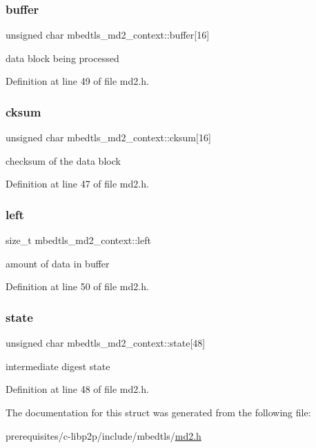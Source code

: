 \subsubsection{\texorpdfstring{buffer}{buffer}}
{\footnotesize\ttfamily unsigned char mbedtls\+\_\+md2\+\_\+context\+::buffer\mbox{[}16\mbox{]}}

data block being processed 

Definition at line 49 of file md2.\+h.

\mbox{\label{structmbedtls__md2__context_a12653607373c617159907a4b5d533c94}} 
\subsubsection{\texorpdfstring{cksum}{cksum}}
{\footnotesize\ttfamily unsigned char mbedtls\+\_\+md2\+\_\+context\+::cksum\mbox{[}16\mbox{]}}

checksum of the data block 

Definition at line 47 of file md2.\+h.

\mbox{\label{structmbedtls__md2__context_a5b070937560df586b3b20287cc6c4bbe}} 
\subsubsection{\texorpdfstring{left}{left}}
{\footnotesize\ttfamily size\+\_\+t mbedtls\+\_\+md2\+\_\+context\+::left}

amount of data in buffer 

Definition at line 50 of file md2.\+h.

\mbox{\label{structmbedtls__md2__context_a2849ae4cd7a078459349c046e97ae503}} 
\subsubsection{\texorpdfstring{state}{state}}
{\footnotesize\ttfamily unsigned char mbedtls\+\_\+md2\+\_\+context\+::state\mbox{[}48\mbox{]}}

intermediate digest state 

Definition at line 48 of file md2.\+h.



The documentation for this struct was generated from the following file\+:\begin{DoxyCompactItemize}
\item 
prerequisites/c-\/libp2p/include/mbedtls/\mbox{\hyperlink{md2_8h}{md2.\+h}}\end{DoxyCompactItemize}

